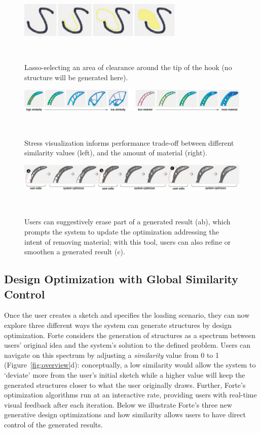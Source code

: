 \begin{figure} [h]
  \centering
  \vskip 4pt
  \includegraphics[width=0.7\textwidth]{figures/draw_clearance}
  \caption{Lasso-selecting an area of clearance around the tip of the hook (no structure will be generated here).}~\label{fig:draw_clearance}
\end{figure}

\begin{figure} [t]
  \centering
  \includegraphics[width=1\textwidth]{figures/sim_mat}
  \caption{Stress visualization informs performance trade-off between different similarity values (left), and the amount of material (right).}~\label{fig:sim_mat}
\end{figure}

\begin{figure} [t]
  \centering
  \includegraphics[width=1\textwidth]{figures/local_editing_eraser}
  \caption{Users can suggestively erase part of a generated result (ab), which prompts the system to update the optimization addressing the intent of removing material; with this tool, users can also refine or smoothen a generated result (c).}~\label{fig:local_editing_eraser}
\end{figure}

\subsection{Design Optimization with Global Similarity Control}

Once the user creates a sketch and specifies the loading scenario, they can now explore three different ways the system can generate structures by design optimization. Forte considers the generation of structures  as a spectrum between users' original idea and the system's solution to the defined problem. Users can navigate on this spectrum by adjusting a \textit{similarity} value from 0 to 1 (Figure~\ref{fig:overview}d): conceptually, a low similarity would allow the system to `deviate' more from the user's initial sketch while a higher value will keep the generated structures closer to what the user originally draws. Further, Forte's optimization algorithms run at an interactive rate, providing users with real-time visual feedback after each iteration.
Below we illustrate Forte's three new generative design optimizations and how similarity allows users to have direct control of the generated results.

